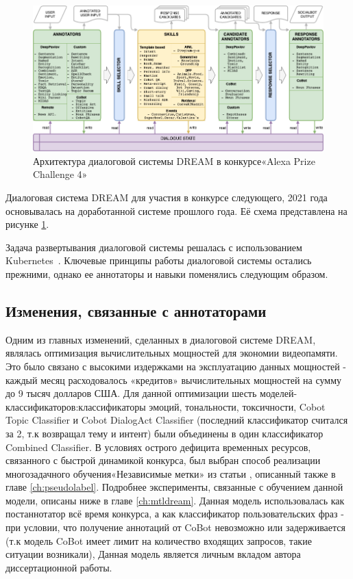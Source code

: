 \begin{figure}[ht]
  \includegraphics[width=\textwidth]{images/Alexa2_.png}
  \caption{Архитектура диалоговой системы {DREAM} в конкурсе«Alexa Prize Challenge 4»}\label{fig:Alexa2}
\end{figure}
Диалоговая система {DREAM} для участия в конкурсе следующего, 2021 года основывалась на доработанной системе прошлого года. Её схема представлена на рисунке \ref{fig:Alexa2}.


Задача развертывания диалоговой системы решалась с использованием Kubernetes~\cite{kubernetes}.
Ключевые принципы работы диалоговой системы остались прежними, однако ее аннотаторы и навыки поменялись следующим образом.

\subsection{Изменения, связанные с аннотаторами}\label{dream:2:ann}

Одним из главных изменений, сделанных в диалоговой системе DREAM, являлась оптимизация вычислительных мощностей для экономии видеопамяти. Это было связано с высокими издержками на эксплуатацию данных мощностей - каждый месяц расходовалось «кредитов» вычислительных мощностей на сумму до 9 тысяч долларов США. Для данной оптимизации шесть моделей-классификаторов:классификаторы эмоций, тональности, токсичности, Cobot Topic Classifier и Cobot DialogAct Classifier (последний классификатор считался за 2, т.к возвращал тему и интент) были объединены в один классификатор Combined Classifier. В условиях острого дефицита временных ресурсов, связанного с быстрой динамикой конкурса, был выбран способ реализации многозадачного обучения«Независимые метки» из статьи  \cite{pseudolabel}, описанный также в главе \ref{ch:pseudolabel}. Подробнее эксперименты, связанные с обучением данной модели, описаны ниже в главе \ref{ch:mtldream}. Данная модель использовалась как постаннотатор всё время конкурса, а как классификатор пользовательских фраз - при условии, что получение аннотаций от CoBot невозможно или задерживается (т.к модель CoBot имеет лимит на количество входящих запросов, такие ситуации возникали),  Данная модель является личным вкладом автора диссертационной работы.

